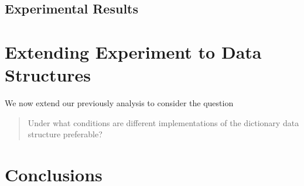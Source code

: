 \documentclass{article}
\begin{document}
\subsection{Experimental Results}



\section{Extending Experiment to Data Structures}
\label{sec:part3}

We now extend our previously analysis to consider the question
\begin{quote}
Under what conditions are different implementations of the dictionary data structure preferable?
\end{quote}

\section{Conclusions}
\label{sec:conclusions}
\end{document}

